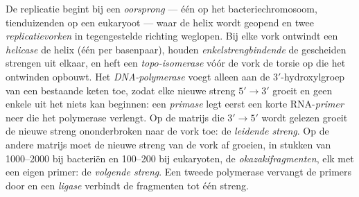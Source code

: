 \begin{definition}\label{def:b1:replication-mitosis:fork}
De replicatie begint bij een \emph{oorsprong} --- één op het bacteriechromosoom,
tienduizenden op een eukaryoot  --- waar de helix wordt geopend en twee
\emph{replicatievorken} in tegengestelde richting weglopen. Bij elke vork ontwindt
een \emph{helicase} de helix (één  per basenpaar), houden
\emph{enkelstrengbindende } de gescheiden strengen uit elkaar, en heft een
\emph{topo-isomerase} vóór de vork de torsie op die het ontwinden opbouwt. Het
\emph{DNA-polymerase} voegt  alleen aan de $3'$-hydroxylgroep van een
bestaande keten toe, zodat elke nieuwe streng $5' \to 3'$ groeit en geen enkele
uit het niets kan beginnen: een \emph{primase} legt eerst een korte
RNA-\emph{primer} neer die het polymerase verlengt. Op de matrijs die $3' \to 5'$
wordt gelezen groeit de nieuwe streng ononderbroken naar de vork toe: de
\emph{leidende streng}. Op de andere matrijs moet de nieuwe streng van de vork af
groeien, in stukken van \qtyrange{1000}{2000}{}  bij bacteriën en
\qtyrange{100}{200}{} bij eukaryoten, de \emph{okazakifragmenten}, elk met een
eigen primer: de \emph{volgende streng}. Een tweede polymerase vervangt de primers
door  en een \emph{ligase} verbindt de fragmenten tot één streng.
\end{definition}

